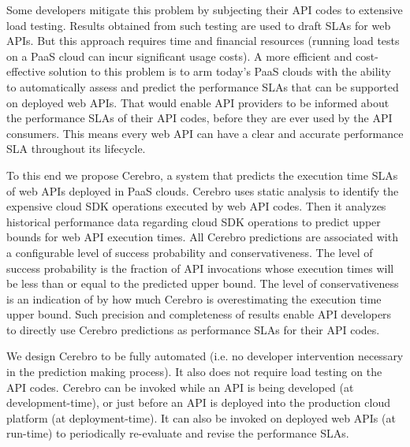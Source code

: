 Some developers mitigate this problem by subjecting their API codes to extensive load testing. Results obtained
from such testing are used to draft SLAs for web APIs.
But this approach requires time and financial resources (running load tests on a 
PaaS cloud can incur significant usage costs).
A more efficient and cost-effective solution to this problem is to arm today's PaaS clouds with the 
ability to automatically assess and
predict the performance SLAs that can be supported on deployed web APIs. 
That would enable API providers to be informed about the performance
SLAs of their API codes, before they are ever used by the API consumers. This means
every web API can have a clear and accurate performance SLA throughout its
lifecycle.

To this end we propose Cerebro, a system that predicts the execution time SLAs of web APIs
deployed in PaaS clouds. Cerebro uses static analysis to identify the expensive cloud SDK operations
executed by web API codes. Then it analyzes historical performance data regarding cloud SDK
operations to predict upper bounds for web API execution times. All Cerebro predictions
are associated with a configurable level of success probability and conservativeness. The level of 
success probability is the fraction of API invocations whose execution times will be less than or equal to the
predicted upper bound. The level of conservativeness is an indication of by how much Cerebro
is overestimating the execution time upper bound. Such precision and completeness of results
enable API developers to directly use Cerebro predictions as performance SLAs for their
API codes. 

We design Cerebro to be fully automated (i.e. no developer intervention necessary in
the prediction making process). It also does not require load testing on the API codes. Cerebro can be
invoked while an API is being developed (at development-time), or just before an API is deployed
into the production cloud platform (at deployment-time). It can also be invoked on deployed
web APIs (at run-time) to periodically re-evaluate and revise the performance SLAs.

